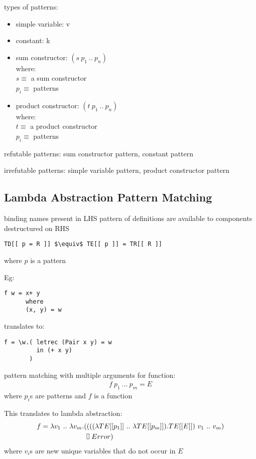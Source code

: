 \documentclass[8pt]{extarticle}
\newcommand*{\vrectangle}{{\setlength{\fboxsep}{0pt}\fbox{\phantom{l}}}}
\begin{document}
\begin{multicols*}{2}
  types of patterns:
  \begin{itemize}
  \item simple variable: v
  \item constant: k
  \item sum constructor: $(s\ p_1\ ..\ p_n)$\\
    where:\\
    $s\equiv$ a sum constructor\\
    $p_i\equiv$ patterns
  \item product constructor: $(t\ p_1\ ..\ p_n)$\\
    where:\\
    $t\equiv$ a product constructor\\
    $p_i\equiv$ patterns
  \end{itemize}

  refutable patterns: sum constructor pattern, constant pattern
  
  irrefutable patterns: simple variable pattern, product constructor pattern
  
  \subsection{Lambda Abstraction Pattern Matching}

  binding names present in LHS pattern of definitions are available to components destructured on RHS

\begin{lstlisting}
TD[[ p = R ]] $\equiv$ TE[[ p ]] = TR[[ R ]]
\end{lstlisting}
where $p$ is a pattern

Eg:
\begin{verbatim}
f w = x+ y
      where
      (x, y) = w
\end{verbatim}

translates to:

\begin{verbatim}
f = \w.( letrec (Pair x y) = w
         in (+ x y)
       )
\end{verbatim}

pattern matching with multiple arguments for function:
  \begin{align*}
    f\ p_1\ ...\ p_m = E
  \end{align*}
  where $p_i$s are patterns and $f$ is a function

  This translates to lambda abstraction:
  \begin{align*}
    f = \lambda v_1\ ..\ \lambda v_m . (&(((\lambda TE[[p_1]]\ ..\ \lambda TE[[p_m]]). TE[[E]])\ v_1\ ..\ v_m)\\
                                        & \vrectangle\ Error)
  \end{align*}
  where $v_i$s are new unique variables that do not occur in $E$


\end{multicols*}
\end{document}
